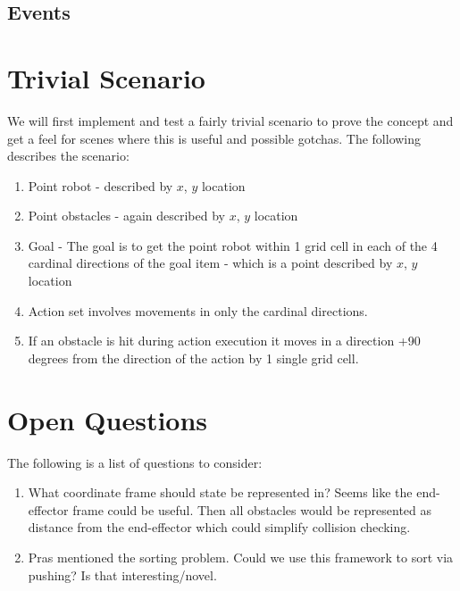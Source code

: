 \documentclass[11pt, oneside]{article}   	%
\begin{document}
\subsection*{Events}


\section*{Trivial Scenario}
We will first implement and test a fairly trivial scenario to prove the concept and get a feel for scenes where this is useful and possible gotchas.   The following describes the scenario:
\begin{enumerate}
\item Point robot - described by $x$, $y$ location
\item Point obstacles - again described by $x$, $y$ location
\item Goal - The goal is to get the point robot within 1 grid cell in each of the 4 cardinal directions of the goal item - which is a point described by $x$, $y$ location
\item Action set involves movements in only the cardinal directions.
\item If an obstacle is hit during action execution it moves in a direction +90 degrees from the direction of the action by 1 single grid cell.
\end{enumerate}

\section*{Open Questions}
The following is a list of questions to consider:
\begin{enumerate}
\item What coordinate frame should state be represented in? Seems like the end-effector frame could be useful.  Then all obstacles would be represented as distance from the end-effector which could simplify collision checking.
\item Pras mentioned the sorting problem.  Could we use this framework to sort via pushing? Is that interesting/novel.
\end{enumerate}
\end{document}
